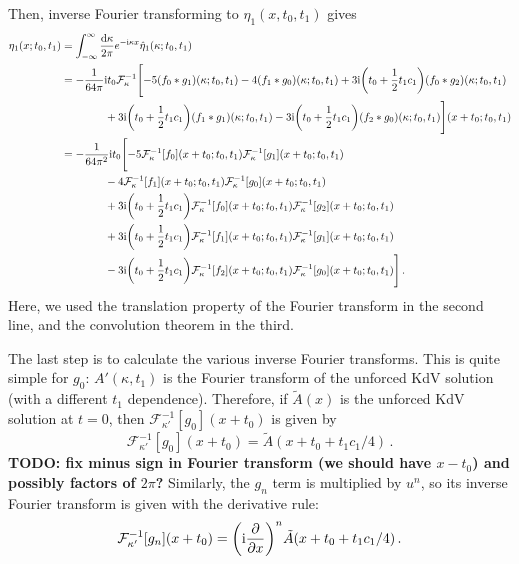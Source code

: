 \documentclass{jfm}
\newcommand{\im}{\mathrm{i}}
\begin{document}
Then, inverse Fourier transforming to $\eta_1(x,t_0,t_1)$ gives
\begin{equation}
\begin{aligned}
  \eta_1(x;t_0,t_1) &=
  \int_{-\infty}^{\infty} \frac{\dd{\kappa}}{2\pi} e^{-\im \kappa x}
  \hat{\eta}_1(\kappa;t_0,t_1) \\
  &= -\frac{1}{64 \pi} \im t_0 \mathcal{F}^{-1}_{\kappa}
   \Biggl[
    -5 (f_0 * g_1)(\kappa; t_0,t_1)
    -4 (f_1 * g_0)(\kappa; t_0,t_1)
    + 3 \im \pqty{t_0 + \frac{1}{2} t_1 c_1} (f_0 * g_2)(\kappa; t_0,t_1) \\
    &\qquad\qquad
    + 3 \im \pqty{t_0 + \frac{1}{2} t_1 c_1} (f_1 * g_1)(\kappa; t_0,t_1)
    - 3 \im \pqty{t_0 + \frac{1}{2} t_1 c_1} (f_2 * g_0)(\kappa; t_0,t_1) \Biggr]
    (x + t_0;t_0,t_1) \\
  &= -\frac{1}{64 \pi^2} \im t_0
   \Biggl[
     -5 \mathcal{F}^{-1}_{\kappa}[f_0](x + t_0;t_0,t_1)
       \mathcal{F}^{-1}_{\kappa}[g_1](x + t_0;t_0,t_1) \\
    &\qquad\qquad
    -4 \mathcal{F}^{-1}_{\kappa}[f_1](x + t_0;t_0,t_1)
       \mathcal{F}^{-1}_{\kappa}[g_0](x + t_0;t_0,t_1) \\
    &\qquad\qquad
    + 3 \im \pqty{t_0 + \frac{1}{2} t_1 c_1}  \mathcal{F}^{-1}_{\kappa}[f_0](x + t_0;t_0,t_1)
       \mathcal{F}^{-1}_{\kappa}[g_2](x + t_0;t_0,t_1) \\
    &\qquad\qquad
    + 3 \im \pqty{t_0 + \frac{1}{2} t_1 c_1}  \mathcal{F}^{-1}_{\kappa}[f_1](x + t_0;t_0,t_1)
       \mathcal{F}^{-1}_{\kappa}[g_1](x + t_0;t_0,t_1) \\
    &\qquad\qquad
    - 3 \im \pqty{t_0 + \frac{1}{2} t_1 c_1}  \mathcal{F}^{-1}_{\kappa}[f_2](x + t_0;t_0,t_1)
       \mathcal{F}^{-1}_{\kappa}[g_0](x + t_0;t_0,t_1)
    \Biggr]
    \,.
  \end{aligned}
  \label{eq:eta_jeffreys_real}
\end{equation}
Here, we used the translation property of the Fourier transform in the
second line, and the convolution theorem in the third.

The last step is to calculate the various inverse Fourier transforms.
This is quite simple for $g_0$: $A'(\kappa,t_1)$ is
the Fourier transform of the unforced KdV solution (with a different
$t_1$ dependence).
Therefore, if $\tilde{A}(x)$ is the unforced KdV solution at $t=0$, then
$\mathcal{F}^{-1}_{\kappa'}[g_0](x+t_0)$ is given by
\[
  \mathcal{F}^{-1}_{\kappa'}[g_0](x+t_0) = \tilde{A}(x+t_0+t_1 c_1/4)
  \,.
\]
\textbf{TODO: fix minus sign in Fourier transform (we should have
$x-t_0$) and possibly factors of $2\pi$?}
Similarly, the $g_n$ term is multiplied by $u^n$, so its inverse Fourier
transform is given with the derivative rule:
\[
  \mathcal{F}^{-1}_{\kappa'}[g_n](x+t_0) = \pqty{\im
  \pdv{x}}^n\tilde{A}(x+t_0+t_1 c_1/4) \,.
\]
\end{document}

